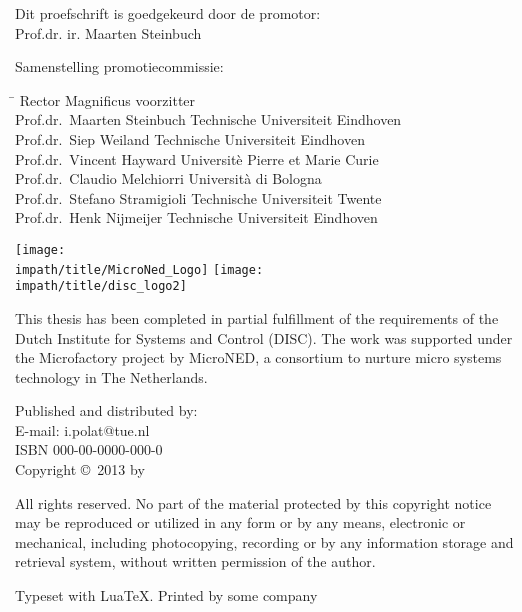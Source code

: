 \newpage %
\thispagestyle{empty}

\noindent Dit proefschrift is goedgekeurd door de promotor:\\
Prof.dr. ir. Maarten Steinbuch\\
\bigskip{}

\noindent Samenstelling promotiecommissie:
\smallskip{}
\noindent
\begin{flushleft}\begin{tabbing}
\hspace*{50mm}\=\kill
Rector Magnificus \> voorzitter\\
Prof.dr.\ Maarten Steinbuch   \> Technische Universiteit Eindhoven\\
Prof.dr.\ Siep Weiland        \> Technische Universiteit Eindhoven\\
Prof.dr.\ Vincent Hayward     \> Universitè Pierre et Marie Curie\\
Prof.dr.\ Claudio Melchiorri  \> Università di Bologna\\
Prof.dr.\ Stefano Stramigioli \> Technische Universiteit Twente\\
Prof.dr.\ Henk Nijmeijer       \> Technische Universiteit Eindhoven\\
\end{tabbing}\end{flushleft}
\smallskip\noindent
{
\flushleft\texttt{[image: \\impath/title/MicroNed\_Logo]}\hspace*{0.75cm}
\vspace{1em}
\texttt{[image: \\impath/title/disc\_logo2]}
\vspace{1em}


\parbox{\textwidth}{\noindent This thesis has been completed in partial fulfillment of
the requirements of the Dutch Institute for Systems and Control
(DISC). The work was supported under the Microfactory project by
MicroNED, a consortium to nurture micro systems technology in
The Netherlands.
}
\bigskip{}


Published and distributed by: \theauthor \\
E-mail: i.polat@tue.nl\\

\bigskip{}
ISBN 000-00-0000-000-0\\
Copyright \copyright~2013 by \theauthor
}


\bigskip{}
\noindent All rights reserved. No part of the material protected by
this copyright notice may be reproduced or utilized in any form or
by any means, electronic or mechanical, including photocopying,
recording or by any information storage and retrieval system,
without written permission of the author.

\bigskip{}
\noindent Typeset with Lua\kern-0.9bp\TeX. Printed by some company

